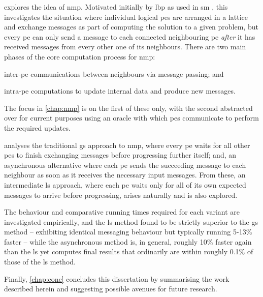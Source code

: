  explores the idea of \gls{nmp}.  Motivated initially by \gls{lbp} \cite{Sun2003,Felzenszwalb2006,Felzenszwalb2011} as used in \gls{sm} \cite{Sinha2020,Tippetts2016,Scharstein2002}, this  investigates the situation where individual logical \glspl{pe} are arranged in a lattice and exchange messages as part of computing the solution to a given problem, but every \gls{pe} can only send a message to each connected neighbouring \gls{pe} \emph{after} it has received messages from every other one of its neighbours.  There are two main phases of the core computation process for \gls{nmp}:
\begin{inparaenum}[a)]
\item inter-\gls{pe} communications between neighbours via message passing; and
\item intra-\gls{pe} computations to update internal data and produce new messages.
\end{inparaenum}  The focus in \cref{chap:nmp} is on the first of these only, with the second abstracted over for current purposes using an oracle with which \glspl{pe} communicate to perform the required updates.

 analyses the traditional \gls{gs} approach to \gls{nmp}, where every \gls{pe} waits for all other \glspl{pe} to finish exchanging messages before progressing further itself; and, an asynchronous alternative where each \gls{pe} sends the succeeding message to each neighbour as soon as it receives the necessary input messages.  From these, an intermediate \gls{ls} approach, where each \gls{pe} waits only for all of its own expected messages to arrive before progressing, arises naturally and is also explored.

The behaviour and comparative running times required for each variant are investigated empirically, and the \gls{ls} method found to be strictly superior to the \gls{gs} method -- exhibiting identical messaging behaviour but typically running 5-13\% faster -- while the asynchronous method is, in general, roughly 10\% faster again than the \gls{ls} yet computes final results that ordinarily are within roughly 0.1\% of those of the \gls{ls} method.

Finally, \cref{chap:conc} concludes this dissertation by summarising the work described herein and suggesting possible avenues for future research.